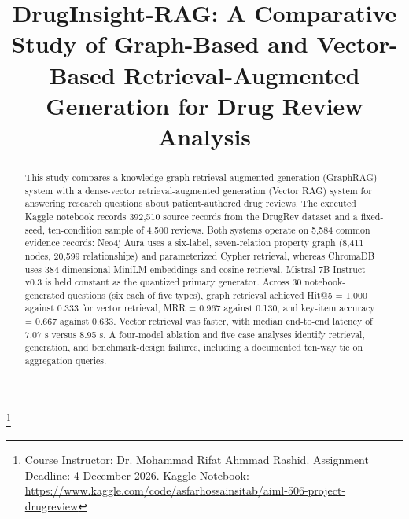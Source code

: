 \documentclass[conference]{IEEEtran}
\begin{document}
\title{DrugInsight-RAG: A Comparative Study of Graph-Based and Vector-Based Retrieval-Augmented Generation for Drug Review Analysis}

\author{
\and
{}
}

\maketitle

\begingroup\renewcommand\thefootnote{}\footnote{Course Instructor: Dr. Mohammad Rifat Ahmmad Rashid. Assignment Deadline: 4 December 2026. Kaggle Notebook: \url{https://www.kaggle.com/code/asfarhossainsitab/aiml-506-project-drugreview}}\addtocounter{footnote}{-1}\endgroup

\begin{abstract}
This study compares a knowledge-graph retrieval-augmented generation (GraphRAG) system with a dense-vector retrieval-augmented generation (Vector RAG) system for answering research questions about patient-authored drug reviews. The executed Kaggle notebook records 392,510 source records from the DrugRev dataset and a fixed-seed, ten-condition sample of 4,500 reviews. Both systems operate on 5,584 common evidence records: Neo4j Aura uses a six-label, seven-relation property graph (8,411 nodes, 20,599 relationships) and parameterized Cypher retrieval, whereas ChromaDB uses 384-dimensional MiniLM embeddings and cosine retrieval. Mistral 7B Instruct v0.3 is held constant as the quantized primary generator. Across 30 notebook-generated questions (six each of five types), graph retrieval achieved Hit@5 = 1.000 against 0.333 for vector retrieval, MRR = 0.967 against 0.130, and key-item accuracy = 0.667 against 0.633. Vector retrieval was faster, with median end-to-end latency of 7.07 s versus 8.95 s. A four-model ablation and five case analyses identify retrieval, generation, and benchmark-design failures, including a documented ten-way tie on aggregation queries.
\end{abstract}
\end{document}
